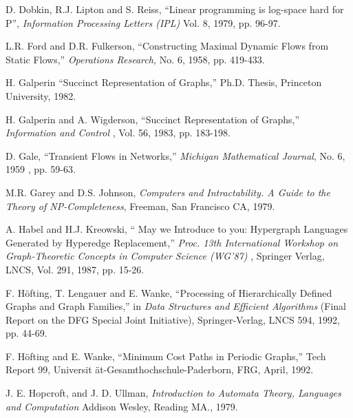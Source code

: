 \begin{thebibliography}{HMRR93}
D. Dobkin, R.J. Lipton and S. Reiss,
``Linear programming is log-space hard for P'',
{\em Information Processing Letters (IPL)} 
Vol. 8, 1979, pp. 96-97.


L.R. Ford and D.R. Fulkerson,
``Constructing Maximal Dynamic Flows from Static Flows,''
{\em Operations Research,}
No. 6, 1958, pp. 419-433.




 H. Galperin 
``Succinct Representation of Graphs,''
Ph.D. Thesis, Princeton University, 1982.





H. Galperin and A. Wigderson,
``Succinct Representation of Graphs,''
{\em Information and Control }, 
Vol. 56, 1983, pp. 183-198.






D. Gale,
``Transient Flows in Networks,''
{\em Michigan Mathematical Journal},
No. 6, 1959 , pp. 59-63.





M.R. Garey and  D.S. Johnson,
{\em Computers and Intractability. A Guide to the Theory of NP-Completeness},
Freeman, San Francisco CA, 1979.





A. Habel and H.J. Kreowski,
`` May we Introduce to you: Hypergraph Languages Generated by 
Hyperedge Replacement,'' 
{\em Proc. 13th International 
Workshop on Graph-Theoretic Concepts in Computer Science (WG'87) }, 
Springer Verlag, LNCS, Vol. 291, 1987, pp. 15-26.




F. H\"ofting, T. Lengauer and E. Wanke,
``Processing of Hierarchically Defined Graphs and 
Graph Families,'' in
{\em Data Structures and Efficient Algorithms}
(Final Report on the DFG Special Joint Initiative),
Springer-Verlag, LNCS 594, 1992, pp. 44-69.


F. H\"ofting and E. Wanke,
``Minimum Cost Paths in Periodic  Graphs,''
Tech Report 99, Universit \"at-Gesamthochschule-Paderborn, FRG,  
April, 1992. 



J. E. Hopcroft, and J. D. Ullman,
{\em Introduction to Automata Theory, Languages and Computation}
Addison Wesley, Reading MA., 1979.





\end{thebibliography}
